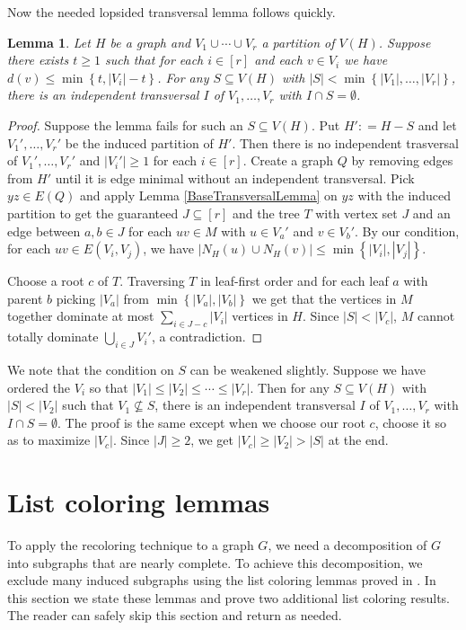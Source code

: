\documentclass[12pt]{article}
\theoremstyle{plain}
\newtheorem{lem}[thm]{Lemma}
\theoremstyle{definition}
\theoremstyle{remark}
\newcommand{\set}[1]{\left\{ #1 \right\}}
\newcommand{\card}[1]{\left|#1\right|}
\newcommand{\irange}[1]{\left[#1\right]}
\newcommand{\DefinedAs}{\mathrel{\mathop:}=}
\begin{document}
Now the needed lopsided transversal lemma follows quickly.

\begin{lem}\label{SingletonSetTransversalLopsided}
Let $H$ be a graph and $V_1 \cup \cdots \cup V_r$ a partition of $V(H)$.  
Suppose there exists $t \geq 1$ such that for each $i \in \irange{r}$ and each $v \in V_i$ we have $d(v) \leq \min\set{t, \card{V_i}-t}$.  For any $S \subseteq V(H)$ with $\card{S} < \min\set{\card{V_1}, \ldots, \card{V_r}}$, there is an independent transversal $I$ of $V_1, \ldots, V_r$ with $I \cap S = \emptyset$.
\end{lem}
\begin{proof}
Suppose the lemma fails for such an $S \subseteq V(H)$.  Put $H' \DefinedAs H - S$ and let $V_1', \ldots, V_r'$ be the induced partition of $H'$. Then there is no independent trasversal of $V_1', \ldots, V_r'$ and $\card{V_i'} \geq 1$ for each $i \in \irange{r}$. Create a graph $Q$ by removing edges from $H'$ until it is edge minimal without an independent transversal. Pick $yz \in E(Q)$ and apply Lemma 
\ref{BaseTransversalLemma} on $yz$ with the induced partition to get the guaranteed 
$J \subseteq \irange{r}$ and the tree $T$ with vertex set $J$ and an edge between $a, b \in
J$ for each $uv \in M$ with $u \in V_a'$ and $v \in V_b'$.  By our condition, for each $uv \in E(V_i, V_j)$, we have $\card{N_H(u) \cup N_H(v)} \leq \min\set{\card{V_i}, \card{V_j}}$.

Choose a root $c$ of $T$. Traversing $T$ in leaf-first order and for each leaf $a$ with parent $b$ picking $|V_a|$ from $\min\set{|V_a|, |V_b|}$ we get that the vertices in $M$ together dominate at most $\sum_{i \in J - c} \card{V_i}$ vertices in $H$.  Since $\card{S} < \card{V_c}$, $M$ cannot totally dominate $\bigcup_{i \in J} V_i'$, a contradiction.
\end{proof}

We note that the condition on $S$ can be weakened slightly.  Suppose we have ordered the $V_i$ so that $\card{V_1} \leq \card{V_2} \leq \cdots \leq \card{V_r}$.  Then for any $S \subseteq V(H)$ with $\card{S} < \card{V_2}$ such that $V_1 \not \subseteq S$, there is an independent transversal $I$ of $V_1, \ldots, V_r$ with $I \cap S = \emptyset$.  The proof is the same except when we choose our root $c$, choose it so as to maximize $\card{V_c}$.  Since $\card{J} \geq 2$, we get $\card{V_c} \geq \card{V_2} > \card{S}$ at the end.

\section{List coloring lemmas}
To apply the recoloring technique to a graph $G$, we need a decomposition of $G$ into subgraphs that are nearly complete.  To achieve this decomposition, we exclude many induced subgraphs using the list coloring
lemmas proved in \cite{mules}.  In this section we state these lemmas and prove two additional list coloring results.  The reader can safely skip this section and return as needed.
\end{document}
